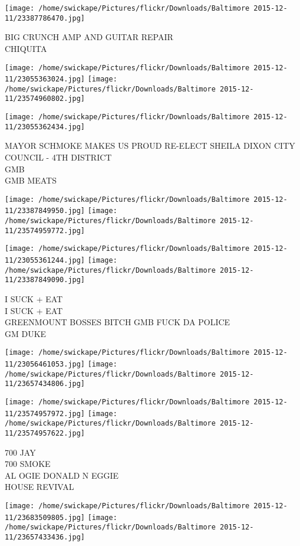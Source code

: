 \documentclass[10pt,letterpaper]{article}
\begin{document}
\vspace{0.25in}
\texttt{[image: /home/swickape/Pictures/flickr/Downloads/Baltimore 2015-12-11/23387786470.jpg]}

BIG CRUNCH AMP AND GUITAR REPAIR\\
CHIQUITA
\pagebreak

\texttt{[image: /home/swickape/Pictures/flickr/Downloads/Baltimore 2015-12-11/23055363024.jpg]}
\texttt{[image: /home/swickape/Pictures/flickr/Downloads/Baltimore 2015-12-11/23574960802.jpg]}

\vspace{0.25in}
\texttt{[image: /home/swickape/Pictures/flickr/Downloads/Baltimore 2015-12-11/23055362434.jpg]}

MAYOR SCHMOKE MAKES US PROUD RE{-}ELECT SHEILA DIXON CITY COUNCIL {-} 4TH DISTRICT\\
GMB\\
GMB MEATS
\pagebreak

\texttt{[image: /home/swickape/Pictures/flickr/Downloads/Baltimore 2015-12-11/23387849950.jpg]}
\texttt{[image: /home/swickape/Pictures/flickr/Downloads/Baltimore 2015-12-11/23574959772.jpg]}

\texttt{[image: /home/swickape/Pictures/flickr/Downloads/Baltimore 2015-12-11/23055361244.jpg]}
\texttt{[image: /home/swickape/Pictures/flickr/Downloads/Baltimore 2015-12-11/23387849090.jpg]}

I SUCK + EAT\\
I SUCK + EAT\\
GREENMOUNT BOSSES BITCH GMB FUCK DA POLICE\\
GM DUKE
\pagebreak

\texttt{[image: /home/swickape/Pictures/flickr/Downloads/Baltimore 2015-12-11/23056461053.jpg]}
\texttt{[image: /home/swickape/Pictures/flickr/Downloads/Baltimore 2015-12-11/23657434806.jpg]}

\texttt{[image: /home/swickape/Pictures/flickr/Downloads/Baltimore 2015-12-11/23574957972.jpg]}
\texttt{[image: /home/swickape/Pictures/flickr/Downloads/Baltimore 2015-12-11/23574957622.jpg]}

700 JAY\\
700 SMOKE\\
AL OGIE DONALD N EGGIE\\
HOUSE REVIVAL
\pagebreak

\texttt{[image: /home/swickape/Pictures/flickr/Downloads/Baltimore 2015-12-11/23683509805.jpg]}
\texttt{[image: /home/swickape/Pictures/flickr/Downloads/Baltimore 2015-12-11/23657433436.jpg]}
\end{document}
